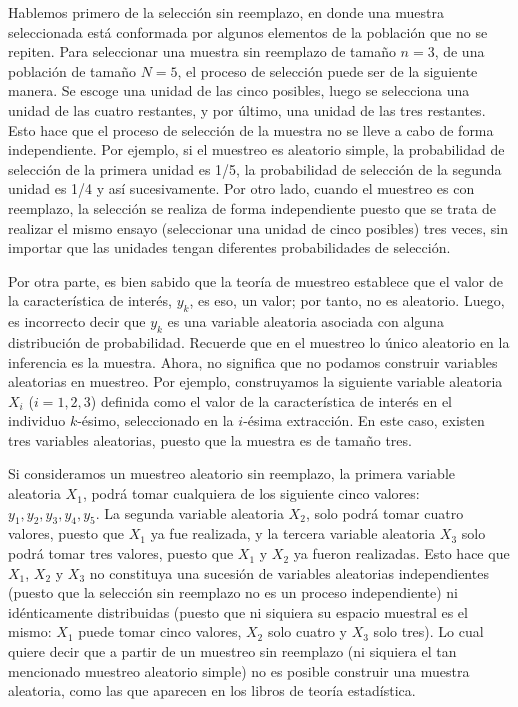 \documentclass[
  12pt,
]{book}
\begin{document}
Hablemos primero de la selección sin reemplazo, en donde una muestra seleccionada está conformada por algunos elementos de la población que no se repiten. Para seleccionar una muestra sin reemplazo de tamaño \(n=3\), de una población de tamaño \(N=5\), el proceso de selección puede ser de la siguiente manera. Se escoge una unidad de las cinco posibles, luego se selecciona una unidad de las cuatro restantes, y por último, una unidad de las tres restantes. Esto hace que el proceso de selección de la muestra no se lleve a cabo de forma independiente. Por ejemplo, si el muestreo es aleatorio simple, la probabilidad de selección de la primera unidad es 1/5, la probabilidad de selección de la segunda unidad es 1/4 y así sucesivamente. Por otro lado, cuando el muestreo es con reemplazo, la selección se realiza de forma independiente puesto que se trata de realizar el mismo ensayo (seleccionar una unidad de cinco posibles) tres veces, sin importar que las unidades tengan diferentes probabilidades de selección.

Por otra parte, es bien sabido que la teoría de muestreo establece que el valor de la característica de interés, \(y_k\), es eso, un valor; por tanto, no es aleatorio. Luego, es incorrecto decir que \(y_k\) es una variable aleatoria asociada con alguna distribución de probabilidad. Recuerde que en el muestreo lo único aleatorio en la inferencia es la muestra. Ahora, no significa que no podamos construir variables aleatorias en muestreo. Por ejemplo, construyamos la siguiente variable aleatoria \(X_i\) (\(i=1,2,3\)) definida como el valor de la característica de interés en el individuo \(k\)-ésimo, seleccionado en la \(i\)-ésima extracción. En este caso, existen tres variables aleatorias, puesto que la muestra es de tamaño tres.

Si consideramos un muestreo aleatorio sin reemplazo, la primera variable aleatoria \(X_1\), podrá tomar cualquiera de los siguiente cinco valores: \(y_1, y_2, y_3, y_4, y_5\). La segunda variable aleatoria \(X_2\), solo podrá tomar cuatro valores, puesto que \(X_1\) ya fue realizada, y la tercera variable aleatoria \(X_3\) solo podrá tomar tres valores, puesto que \(X_1\) y \(X_2\) ya fueron realizadas. Esto hace que \(X_1\), \(X_2\) y \(X_3\) no constituya una sucesión de variables aleatorias independientes (puesto que la selección sin reemplazo no es un proceso independiente) ni idénticamente distribuidas (puesto que ni siquiera su espacio muestral es el mismo: \(X_1\) puede tomar cinco valores, \(X_2\) solo cuatro y \(X_3\) solo tres). Lo cual quiere decir que a partir de un muestreo sin reemplazo (ni siquiera el tan mencionado muestreo aleatorio simple) no es posible construir una muestra aleatoria, como las que aparecen en los libros de teoría estadística.
\end{document}
